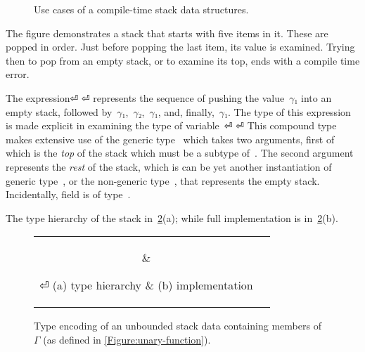 \begin{figure}[htb]
  \caption{\label{Figure:stack-use-cases}%
    Use cases of a compile-time stack data structures.
  }
\end{figure}

The figure demonstrates a stack that starts with five items in it.
These are popped in order. Just before popping the last item, its 
  value is examined.
Trying then to pop from an empty stack, or to examine its top, ends with 
  a compile time error.

The expression⏎
\mbox{\qquad\qquad}⏎
represents the sequence of pushing the value~$γ₁$ into an
  empty stack, followed by~$γ₁$,~$γ₂$,~$γ₁$, and, finally,~$γ₁$.
The type of this expression is made explicit in examining the type of variable~⏎
\mbox{\qquad\qquad}⏎
This compound type makes extensive use of the generic type~ which takes two arguments,
  first of which is the \emph{top} of the stack
    which must be a subtype of~.
The second argument represents the \emph{rest} of the stack, which is can be yet another instantiation
    of generic type~, or the non-generic type~, that represents the empty stack.
    Incidentally,  field  is of type~.

The type hierarchy of the stack in~\cref{Figure:stack-encoding}(a);
  while full \Java implementation is in~\cref{Figure:stack-encoding}(b).

\begin{figure}[htb]
  \caption{\label{Figure:stack-encoding} Type encoding of an unbounded
  stack data containing members of~$Γ$ (as defined in \cref{Figure:unary-function}).}
    \begin{tabular}{cc}
      \hspace{-12ex}
      \parbox[c]{0.3\linewidth}{%
        
      }
      &
      \hspace{-4ex}
      \parbox[c]{75ex}{}⏎
      \hspace{-12ex} (a) type hierarchy & (b) implementation
    \end{tabular}
\end{figure}

